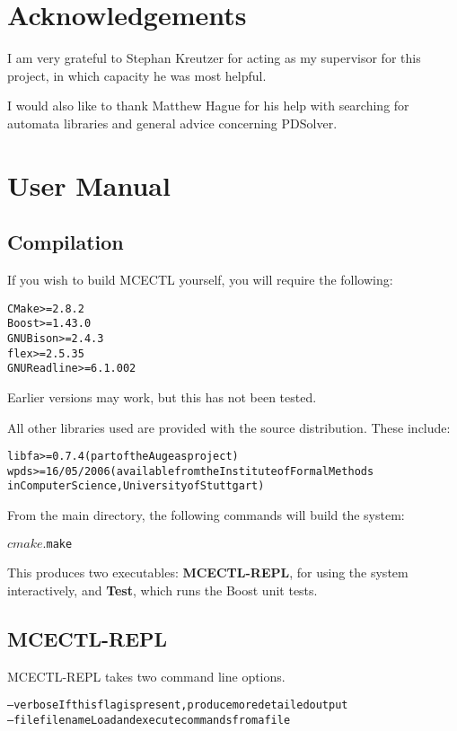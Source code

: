 \documentclass[11pt]{article}
\theoremstyle{definition}
\begin{document}
{\section{Acknowledgements}

I am very grateful to Stephan Kreutzer for acting as my supervisor for this
project, in which capacity he was most helpful.

I would also like to thank Matthew Hague for his help with searching for
automata libraries and general advice concerning PDSolver.

{}


\appendix
\section{User Manual}

\subsection{Compilation}

If you wish to build MCECTL yourself, you will require the following:
\begin{alltt}
CMake >= 2.8.2
Boost >= 1.43.0
GNU Bison >= 2.4.3
flex >= 2.5.35
GNU Readline >= 6.1.002
\end{alltt}

Earlier versions may work, but this has not been tested.

All other libraries used are provided with the source distribution. These include:
\begin{alltt}
libfa >= 0.7.4 (part of the Augeas project)
wpds >= 16/05/2006 (available from the Institute of Formal Methods 
in Computer Science, University of Stuttgart)
\end{alltt}

From the main directory, the following commands will build the system:
\begin{alltt}
$ cmake .
$ make
\end{alltt}

This produces two executables: \textbf{MCECTL-REPL}, for using the system
interactively, and \textbf{Test}, which runs the Boost unit tests. 

\subsection{MCECTL-REPL}

MCECTL-REPL takes two command line options.
\begin{alltt}
--verbose         If this flag is present, produce more detailed output
--file filename   Load and execute commands from a file
\end{alltt}

}
\end{document}
